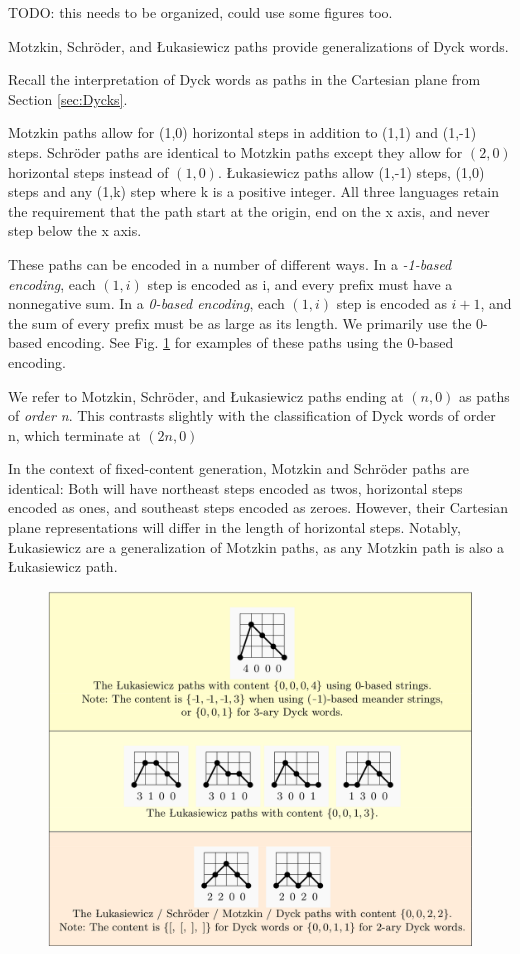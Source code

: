TODO: this needs to be organized, could use some figures too.

Motzkin, Schröder, and Łukasiewicz paths provide generalizations of Dyck words.  

Recall the interpretation of Dyck words as paths in the Cartesian plane from Section \ref{sec:Dycks}.

Motzkin paths allow for (1,0) horizontal steps in addition to (1,1) and (1,-1) steps. Schröder paths are identical to Motzkin paths except they allow for $(2,0)$ horizontal steps instead of $(1,0)$.  Łukasiewicz paths allow (1,-1) steps, (1,0) steps and any (1,k) step where k is a positive integer.  All three languages retain the requirement that the path start at the origin, end on the x axis, and never step below the x axis. 

These paths can be encoded in a number of different ways.  In a \emph{-1-based encoding}, each $(1,i)$ step is encoded as i, and every prefix must have a nonnegative sum.  In a \emph{0-based encoding}, each $(1,i)$ step is encoded as $i+1$, and the sum of every prefix must be as large as its length. We primarily use the 0-based encoding. See Fig. \ref{fig:paths}  for examples of these paths using the 0-based encoding.

We refer to Motzkin, Schröder, and Łukasiewicz paths ending at $(n,0)$ as paths of \emph{order n}.  This contrasts slightly with the classification of Dyck words of order n, which terminate at $(2n,0)$

In the context of fixed-content generation, Motzkin and Schröder paths are identical:  Both will have northeast steps encoded as twos, horizontal steps encoded as ones, and southeast steps encoded as zeroes.  However, their Cartesian plane representations will differ in the length of horizontal steps. Notably, Łukasiewicz are a generalization of Motzkin paths, as any Motzkin path is also a Łukasiewicz path.

\begin{figure}[]
	\centering
	\includegraphics[width = .95 \textwidth]{paths.png}
	\caption{}
	\label{fig:paths}
\end{figure}


